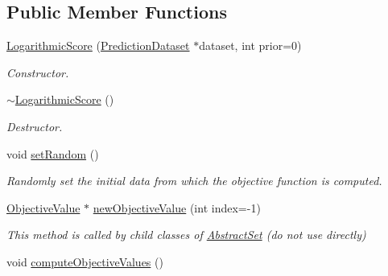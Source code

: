 \subsection*{Public Member Functions}
\begin{DoxyCompactItemize}
\item 
\hyperlink{classLogarithmicScore_a4fba67dfac53087dbfde7cb825501c97}{Logarithmic\-Score} (\hyperlink{classPredictionDataset}{Prediction\-Dataset} $\ast$dataset, int prior=0)
\begin{DoxyCompactList}\small\item\em Constructor. \end{DoxyCompactList}\item 
\hypertarget{classLogarithmicScore_a08b425a72eec8a2722bb2f4a9b0486ff}{\hyperlink{classLogarithmicScore_a08b425a72eec8a2722bb2f4a9b0486ff}{$\sim$\-Logarithmic\-Score} ()}\label{classLogarithmicScore_a08b425a72eec8a2722bb2f4a9b0486ff}

\begin{DoxyCompactList}\small\item\em Destructor. \end{DoxyCompactList}\item 
\hypertarget{classLogarithmicScore_a7e3c601e96541b3156b02d84ce6b754e}{void \hyperlink{classLogarithmicScore_a7e3c601e96541b3156b02d84ce6b754e}{set\-Random} ()}\label{classLogarithmicScore_a7e3c601e96541b3156b02d84ce6b754e}

\begin{DoxyCompactList}\small\item\em Randomly set the initial data from which the objective function is computed. \end{DoxyCompactList}\item 
\hypertarget{classLogarithmicScore_ab64011283bff491364cdffb0420dc89b}{\hyperlink{classObjectiveValue}{Objective\-Value} $\ast$ \hyperlink{classLogarithmicScore_ab64011283bff491364cdffb0420dc89b}{new\-Objective\-Value} (int index=-\/1)}\label{classLogarithmicScore_ab64011283bff491364cdffb0420dc89b}

\begin{DoxyCompactList}\small\item\em This method is called by child classes of \hyperlink{classAbstractSet}{Abstract\-Set} (do not use directly) \end{DoxyCompactList}\item 
\hypertarget{classLogarithmicScore_ac0a5eb6f03d9afd66a05aded42e6647f}{void \hyperlink{classLogarithmicScore_ac0a5eb6f03d9afd66a05aded42e6647f}{compute\-Objective\-Values} ()}\label{classLogarithmicScore_ac0a5eb6f03d9afd66a05aded42e6647f}


\end{DoxyCompactItemize}
